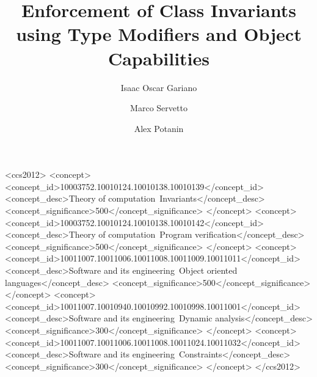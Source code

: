 \documentclass[english,submission,code=tt]{programming}
\theoremstyle{plain}
\begin{document}
\title{Enforcement of Class Invariants using Type Modifiers and Object Capabilities}
\author{Isaac Oscar Gariano}
\author{Marco Servetto}
\author{Alex Potanin}



\begin{CCSXML}
<ccs2012>
	<concept>
		<concept_id>10003752.10010124.10010138.10010139</concept_id>
		<concept_desc>Theory of computation~Invariants</concept_desc>
		<concept_significance>500</concept_significance>
	</concept>
	<concept>
		<concept_id>10003752.10010124.10010138.10010142</concept_id>
		<concept_desc>Theory of computation~Program verification</concept_desc>
		<concept_significance>500</concept_significance>
	</concept>
	<concept>
		<concept_id>10011007.10011006.10011008.10011009.10011011</concept_id>
		<concept_desc>Software and its engineering~Object oriented languages</concept_desc>
		<concept_significance>500</concept_significance>
	</concept>
	<concept>
		<concept_id>10011007.10010940.10010992.10010998.10011001</concept_id>
		<concept_desc>Software and its engineering~Dynamic analysis</concept_desc>
		<concept_significance>300</concept_significance>
	</concept>
	<concept>
		<concept_id>10011007.10011006.10011008.10011024.10011032</concept_id>
		<concept_desc>Software and its engineering~Constraints</concept_desc>
		<concept_significance>300</concept_significance>
	</concept>
</ccs2012>
\end{CCSXML}

\end{document}
